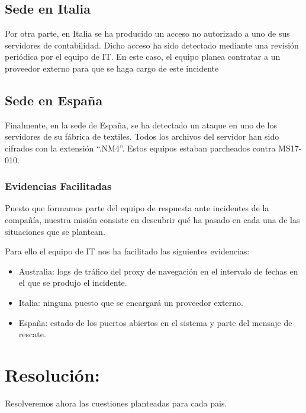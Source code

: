 \documentclass[12pt,twoside]{article}
\begin{document}
\subsection{Sede en Italia}
Por otra parte, en Italia se ha producido un acceso no autorizado a uno de sus servidores de contabilidad. Dicho acceso ha sido detectado mediante una revisión periódica por el equipo de IT. En este caso, el equipo planea contratar a un proveedor externo para que se haga cargo de este incidente

\subsection{Sede en España}
Finalmente, en la sede de España, se ha detectado un ataque en uno de los servidores de su fábrica de textiles. Todos los archivos del servidor han sido cifrados con la extensión “.NM4”. Estos equipos estaban parcheados contra MS17-010.

\subsubsection{Evidencias Facilitadas}
Puesto que formamos parte del equipo de respuesta ante incidentes de la compañía, nuestra misión consiste en descubrir qué ha pasado en cada una de las situaciones que se plantean.

Para ello el equipo de IT nos ha facilitado las siguientes evidencias:
\begin{itemize}
    \item Australia: logs de tráfico del proxy de navegación en el intervalo de fechas en el que se produjo el incidente.
    \item Italia: ninguna puesto que se encargará un proveedor externo.
    \item España: estado de los puertos abiertos en el sistema y parte del mensaje de rescate.
\end{itemize}

\newpage
\section{Resolución:}
Resolveremos ahora las cuestiones planteadas para cada pais.
\end{document}
